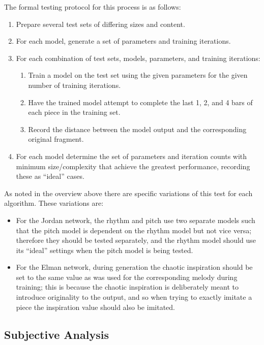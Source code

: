 \documentclass[ author={Stephen Livermore-Tozer},
				supervisor={Dr. Peter Flach},
				degree={MEng},
				title={Algorithmic Co-composition Using Machine Learning},
				subtitle={},
				type={research},
				year={2016} ]{dissertation}
\begin{document}
	The formal testing protocol for this process is as follows:
	\begin{enumerate}
		\item Prepare several test sets of differing sizes and content.
		\item For each model, generate a set of parameters and training iterations.
		\item For each combination of test sets, models, parameters, and training iterations:
		\begin{enumerate}
			\item Train a model on the test set using the given parameters for the given number of training iterations.
			\item Have the trained model attempt to complete the last 1, 2, and 4 bars of each piece in the training set.
			\item Record the distance between the model output and the corresponding original fragment.
		\end{enumerate}
		\item For each model determine the set of parameters and iteration counts with minimum size/complexity that achieve the greatest performance, recording these as ``ideal'' cases.
	\end{enumerate}
	
	As noted in the overview above there are specific variations of this test for each algorithm. These variations are:
	\begin{itemize}
		\item For the Jordan network, the rhythm and pitch use two separate models such that the pitch model is dependent on the rhythm model but not vice versa; therefore they should be tested separately, and the rhythm model should use its ``ideal'' settings when the pitch model is being tested.
		\item For the Elman network, during generation the chaotic inspiration should be set to the same value as was used for the corresponding melody during training; this is because the chaotic inspiration is deliberately meant to introduce originality to the output, and so when trying to exactly imitate a piece the inspiration value should also be imitated.
	\end{itemize}
	
	\subsection{Subjective Analysis}
	\label{sec:subjective-analysis}
	
\end{document}
